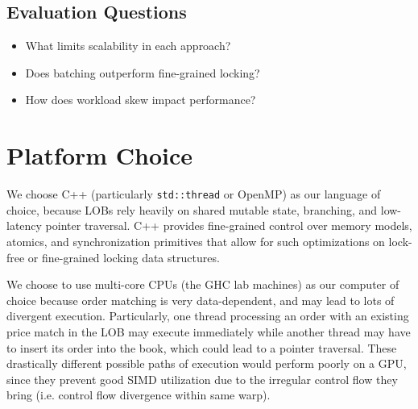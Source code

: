\documentclass[11pt]{article}
\begin{document}
\subsection*{Evaluation Questions}
\begin{itemize}
    \item What limits scalability in each approach?
    \item Does batching outperform fine-grained locking?
    \item How does workload skew impact performance?
\end{itemize}

\section*{Platform Choice}
We choose C++ (particularly \texttt{std::thread} or OpenMP) as our language of choice, because LOBs rely heavily on shared mutable state, branching, and low-latency pointer traversal. C++ provides fine-grained control over memory models, atomics, and synchronization primitives that allow for such optimizations on lock-free or fine-grained locking data structures. 

We choose to use multi-core CPUs (the GHC lab machines) as our computer of choice because order matching is very data-dependent, and may lead to lots of divergent execution. Particularly, one thread processing an order with an existing price match in the LOB may execute immediately while another thread may have to insert its order into the book, which could lead to a pointer traversal. These drastically different possible paths of execution would perform poorly on a GPU, since they prevent good SIMD utilization due to the irregular control flow they bring (i.e. control flow divergence within same warp).
\end{document}
